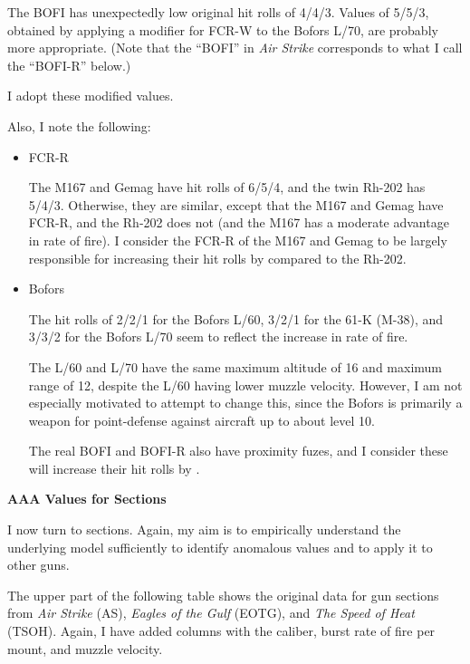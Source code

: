 \documentclass[10pt]{article}
\newcommand{\notesection}[1]{%
    \par{\bfseries #1}\par
}
\begin{document}
{\begin{itemize}
            The BOFI has unexpectedly low original hit rolls of 4/4/3. Values of 5/5/3, obtained by applying a  modifier for FCR-W to the Bofors L/70, are probably more appropriate. (Note that the “BOFI” in \emph{Air Strike} corresponds to what I call the “BOFI-R” below.)

    \end{itemize}

    I adopt these modified values.

    Also, I note the following:

    \begin{itemize}

        \item FCR-R

            The M167 and Gemag have hit rolls of 6/5/4, and the twin Rh-202 has 5/4/3. Otherwise, they are similar, except that the M167 and Gemag have FCR-R, and the Rh-202 does not (and the M167 has a moderate advantage in rate of fire). I consider the FCR-R of the M167 and Gemag to be largely responsible for increasing their hit rolls by  compared to the Rh-202.

        \item Bofors

            The hit rolls of 2/2/1 for the Bofors L/60, 3/2/1 for the 61-K (M-38), and 3/3/2 for the Bofors L/70 seem to reflect the increase in rate of fire.

            The L/60 and L/70 have the same maximum altitude of 16 and maximum range of 12, despite the L/60 having lower muzzle velocity. However, I am not especially motivated to attempt to change this, since the Bofors is primarily a weapon for point-defense against aircraft up to about level 10.

            The real BOFI and BOFI-R also have proximity fuzes, and I consider these will increase their hit rolls by .

    \end{itemize}

    \notesection{AAA Values for Sections}

    I now turn to sections. Again, my aim is to empirically understand the underlying model sufficiently to identify anomalous values and to apply it to other guns.

    The upper part of the following table shows the original data for gun sections from \emph{Air Strike} (AS), \emph{Eagles of the Gulf} (EOTG), and \emph{The Speed of Heat} (TSOH). Again, I have added columns with the caliber, burst rate of fire per mount, and muzzle velocity.

}
\end{document}
